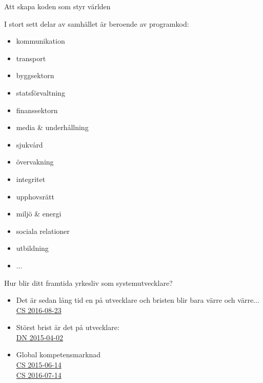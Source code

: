 \begin{Slide}{Att skapa koden som styr världen}
\begin{multicols}{2}\footnotesize
I stort sett  delar av samhället är beroende av programkod:
\begin{itemize}\scriptsize
\item kommunikation
\item transport
\item byggsektorn
\item statsförvaltning
\item finanssektorn
\item media \& underhållning
\item sjukvård
\item övervakning
\item integritet
\item upphovsrätt
\item miljö \& energi
\item sociala relationer
\item utbildning
\item ...
\end{itemize}
\columnbreak %
Hur blir ditt framtida yrkesliv som systemutvecklare?
\begin{itemize}
\item  Det är sedan lång tid en  på utvecklare och bristen blir bara värre och värre... \\
  \href{http://computersweden.idg.se/2.2683/1.663879/oppen-kallkod-brist-kompetens}{CS 2016-08-23}

\item Störst brist är det på  utvecklare: \\
\href{http://www.dn.se/ekonomi/it-branschen-hotas-av-brist-pa-kvinnor/}{DN 2015-04-02}
\item Global kompetensmarknad \\
  \href{http://computersweden.idg.se/2.2683/1.630901/det-finns-programmerare-och-sa-finns-det-programmerare}{CS 2015-06-14} \\
  \href{http://computersweden.idg.se/2.2683/1.662186/25-miljoner-utvecklare?queryText=miljoner\%20utvecklare}{CS 2016-07-14 }
\end{itemize}
\end{multicols}
\end{Slide}


